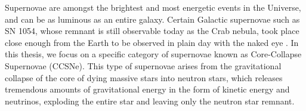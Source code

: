  \label{chap:intro}


Supernovae are amongst the brightest and most energetic events in the Universe, and can be as luminous as an entire galaxy. Certain Galactic supernovae such as SN 1054, whose remnant is still observable today as the Crab nebula, took place close enough from the Earth to be observed in plain day with the naked eye \citep{Hamacher2014}. In this thesis, we focus on a specific category of supernovae known as Core-Collapse Supernovae (CCSNe). This type of supernovae arises from the gravitational collapse of the core of dying massive stars into neutron stars, which releases tremendous amounts of gravitational energy in the form of kinetic energy and neutrinos, exploding the entire star and leaving only the neutron star remnant.

